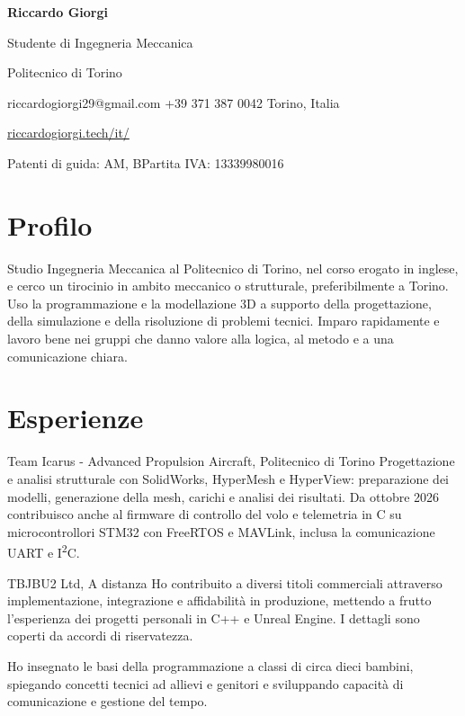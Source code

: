 \documentclass[a4paper,10pt]{article}
\begin{document}
{\Huge\bfseries Riccardo Giorgi}\par
{\large Studente di Ingegneria Meccanica}\par
{\color{muted}Politecnico di Torino}\par
riccardogiorgi29@gmail.com
\enspace\textbullet\enspace +39 371 387 0042
\enspace\textbullet{} Torino, Italia\par
\url{riccardogiorgi.tech/it/}\par
{\small Patenti di guida: AM, B\enspace\textbullet\enspace Partita IVA: 13339980016}

\section*{Profilo}
Studio Ingegneria Meccanica al Politecnico di Torino, nel corso erogato in
inglese, e cerco un tirocinio in ambito meccanico o strutturale, preferibilmente
a Torino. Uso la programmazione e la modellazione 3D a supporto della
progettazione, della simulazione e della risoluzione di problemi tecnici.
Imparo rapidamente e lavoro bene nei gruppi che danno valore alla logica,
al metodo e a una comunicazione chiara.

\section*{Esperienze}
  {Team Icarus - Advanced Propulsion Aircraft, Politecnico di Torino}
  {Progettazione e analisi strutturale con SolidWorks, HyperMesh e HyperView:
  preparazione dei modelli, generazione della mesh, carichi e analisi dei
  risultati. Da ottobre 2026 contribuisco anche al firmware di controllo del
  volo e telemetria in C su microcontrollori STM32 con FreeRTOS e MAVLink,
  inclusa la comunicazione UART e I\textsuperscript{2}C.}

  {TBJBU2 Ltd, A distanza}
  {Ho contribuito a diversi titoli commerciali attraverso implementazione,
  integrazione e affidabilità in produzione, mettendo a frutto l'esperienza
  dei progetti personali in C++ e Unreal Engine. I dettagli sono coperti
  da accordi di riservatezza.}

  {Ho insegnato le basi della programmazione a classi di circa dieci bambini,
  spiegando concetti tecnici ad allievi e genitori e sviluppando capacità di
  comunicazione e gestione del tempo.}
\end{document}
